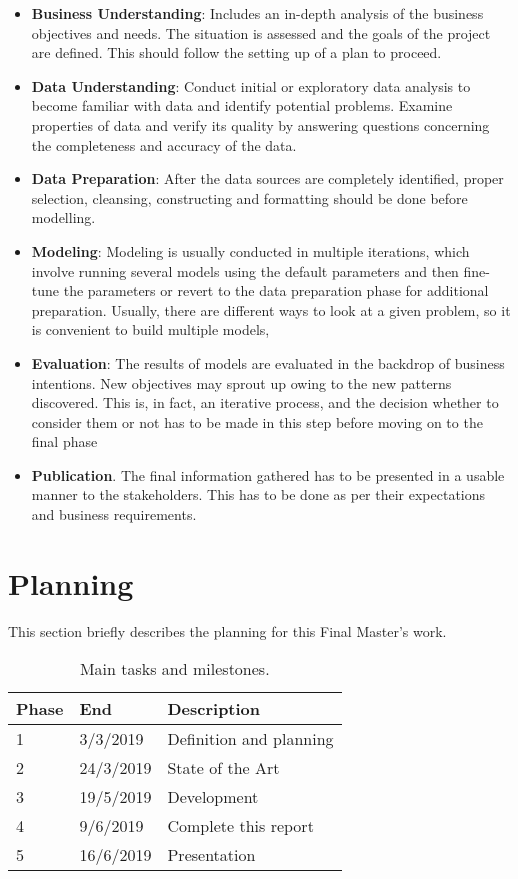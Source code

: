 \begin{itemize}
\item \textbf{Business Understanding}: Includes an in-depth analysis of the business objectives and needs. The situation is assessed and the goals of the project are defined. This should follow the setting up of a plan to proceed.
\item \textbf{Data Understanding}: Conduct initial or exploratory data analysis to become familiar with data and identify potential problems. Examine properties of data and verify its quality by answering questions concerning the completeness and accuracy of the data.
\item \textbf{Data Preparation}: After the data sources are completely identified, proper selection, cleansing, constructing and formatting should be done before modelling. 
\item \textbf{Modeling}: Modeling is usually conducted in multiple iterations, which involve running  several models using the default parameters and then fine-tune the parameters or revert to the data preparation phase for additional preparation. Usually, there are different ways to look at a given problem, so it is convenient to build multiple models,
\item \textbf{Evaluation}: The results of models are evaluated in the backdrop of business intentions. New objectives may sprout up owing to the new patterns discovered. This is, in fact, an iterative process, and the decision whether to consider them or not has to be made in this step before moving on to the final phase
\item \textbf{Publication}. The final information gathered has to be presented in a usable manner to the stakeholders.  This has to be done as per their expectations and business requirements.
\end{itemize}


\section{Planning}

This section briefly describes the planning for this Final Master's work.

\begin{table}[ht]
\centering
\caption{Main tasks and milestones.}
\label{tab:retrieval-classification}
\begin{tabular}[t]{lll}
    \toprule
    Phase & End  & Description\\
    \midrule
    1 & 3/3/2019 & Definition and planning\\
    2 & 24/3/2019 & State of the Art\\
    3 & 19/5/2019 & Development\\
    4 & 9/6/2019 & Complete this report\\
    5 & 16/6/2019 & Presentation\\
    \bottomrule
\end{tabular}
\end{table}


